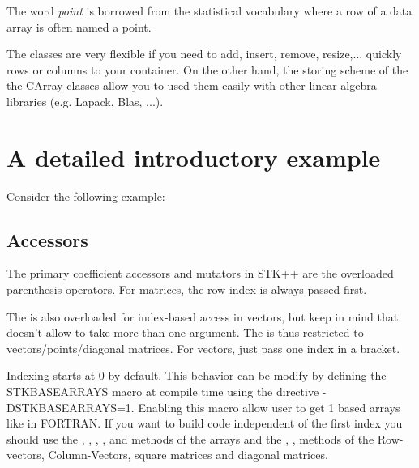 \documentclass[a4paper,10pt]{article}
\begin{document}
The word \emph{point} is borrowed from the statistical vocabulary where a row
of a data array is often named a point.

The  classes are very flexible if you need to add, insert, remove,
resize,... quickly rows or columns to your container. On the other hand, the
storing scheme of the the CArray classes allow you to used them easily with
other linear algebra libraries (e.g. Lapack, Blas, ...).

\section{A detailed introductory example}
Consider the following example:

\begin{minipage}[t]{0.66\textwidth}

\end{minipage}
\hspace{0.2cm}
\begin{minipage}[t]{0.33\textwidth}
\addtocounter{lstlisting}{-1}

\end{minipage}

\subsection{Accessors}
The primary coefficient accessors and mutators in STK++ are the overloaded
parenthesis operators. For matrices, the row index is always
passed first.

The  is also overloaded for index-based access in
vectors, but keep in mind that \Cpp{} doesn't allow  to take
more than one argument. The  is thus restricted to
vectors/points/diagonal matrices. For vectors, just pass one index in a bracket.

Indexing starts at 0 by default. This behavior can be modify by defining the
STKBASEARRAYS macro at compile time using the directive -DSTKBASEARRAYS=1.
Enabling this macro allow user to get 1 based arrays like in FORTRAN.
If you want to build code independent of the first index you should use the
, , , ,
 and  methods of the arrays and the
, ,  methods of the Row-vectors,
Column-Vectors, square matrices and diagonal matrices.
\end{document}
